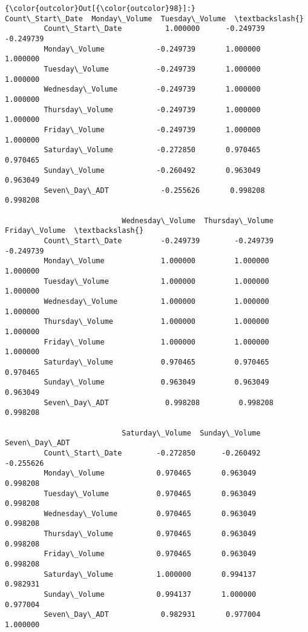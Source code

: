 \documentclass[11pt]{article}
\begin{document}
\begin{Verbatim}[commandchars=\\\{\}]
{\color{outcolor}Out[{\color{outcolor}98}]:}                   Count\_Start\_Date  Monday\_Volume  Tuesday\_Volume  \textbackslash{}
         Count\_Start\_Date          1.000000      -0.249739       -0.249739   
         Monday\_Volume            -0.249739       1.000000        1.000000   
         Tuesday\_Volume           -0.249739       1.000000        1.000000   
         Wednesday\_Volume         -0.249739       1.000000        1.000000   
         Thursday\_Volume          -0.249739       1.000000        1.000000   
         Friday\_Volume            -0.249739       1.000000        1.000000   
         Saturday\_Volume          -0.272850       0.970465        0.970465   
         Sunday\_Volume            -0.260492       0.963049        0.963049   
         Seven\_Day\_ADT            -0.255626       0.998208        0.998208   
         
                           Wednesday\_Volume  Thursday\_Volume  Friday\_Volume  \textbackslash{}
         Count\_Start\_Date         -0.249739        -0.249739      -0.249739   
         Monday\_Volume             1.000000         1.000000       1.000000   
         Tuesday\_Volume            1.000000         1.000000       1.000000   
         Wednesday\_Volume          1.000000         1.000000       1.000000   
         Thursday\_Volume           1.000000         1.000000       1.000000   
         Friday\_Volume             1.000000         1.000000       1.000000   
         Saturday\_Volume           0.970465         0.970465       0.970465   
         Sunday\_Volume             0.963049         0.963049       0.963049   
         Seven\_Day\_ADT             0.998208         0.998208       0.998208   
         
                           Saturday\_Volume  Sunday\_Volume  Seven\_Day\_ADT  
         Count\_Start\_Date        -0.272850      -0.260492      -0.255626  
         Monday\_Volume            0.970465       0.963049       0.998208  
         Tuesday\_Volume           0.970465       0.963049       0.998208  
         Wednesday\_Volume         0.970465       0.963049       0.998208  
         Thursday\_Volume          0.970465       0.963049       0.998208  
         Friday\_Volume            0.970465       0.963049       0.998208  
         Saturday\_Volume          1.000000       0.994137       0.982931  
         Sunday\_Volume            0.994137       1.000000       0.977004  
         Seven\_Day\_ADT            0.982931       0.977004       1.000000  
\end{Verbatim}
            
\end{document}
